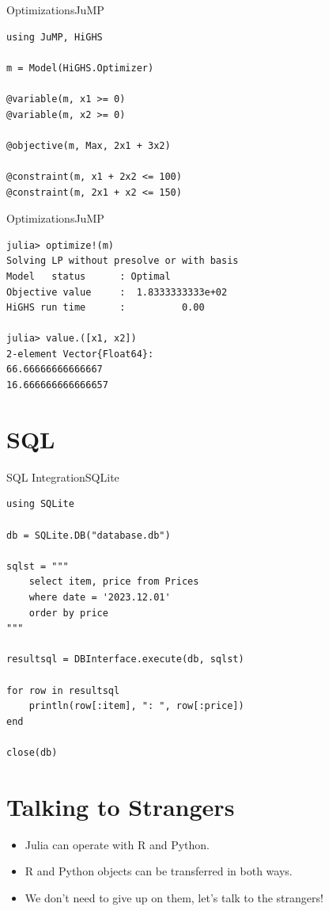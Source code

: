 \documentclass[11pt]{beamer}
\begin{document}
\begin{frame}[fragile]{Optimizations}{JuMP}
\begin{lstlisting}[basicstyle=\small]
using JuMP, HiGHS

m = Model(HiGHS.Optimizer)

@variable(m, x1 >= 0)
@variable(m, x2 >= 0)

@objective(m, Max, 2x1 + 3x2)

@constraint(m, x1 + 2x2 <= 100)
@constraint(m, 2x1 + x2 <= 150)
\end{lstlisting}
\end{frame}


\begin{frame}[fragile]{Optimizations}{JuMP}
\begin{lstlisting}
julia> optimize!(m)
Solving LP without presolve or with basis
Model   status      : Optimal
Objective value     :  1.8333333333e+02
HiGHS run time      :          0.00

julia> value.([x1, x2])
2-element Vector{Float64}:
66.66666666666667
16.666666666666657	
\end{lstlisting}
\end{frame}

\section{SQL}
\begin{frame}[fragile]{SQL Integration}{SQLite}
\begin{lstlisting}[basicstyle=\tiny]
using SQLite

db = SQLite.DB("database.db")

sqlst = """ 
	select item, price from Prices 
	where date = '2023.12.01' 
	order by price
"""

resultsql = DBInterface.execute(db, sqlst)

for row in resultsql
	println(row[:item], ": ", row[:price])
end 

close(db)
\end{lstlisting}
\end{frame}


\section{Talking to Strangers}

\begin{frame} 
\begin{itemize}
\item Julia can operate with R and Python.
\item R and Python objects can be transferred in both ways.
\item We don't need to give up on them, let's talk to the strangers!
\end{itemize}
\end{frame}
\end{document}
